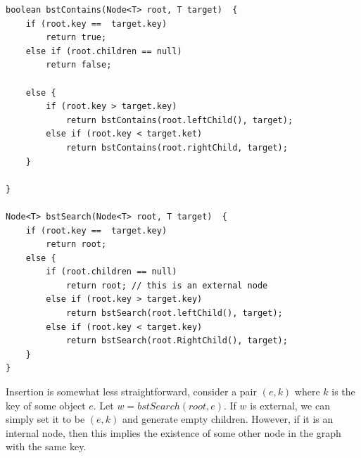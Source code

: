 \documentclass[9pt]{article} %
\begin{document}
	 \begin{lstlisting}
boolean bstContains(Node<T> root, T target)  {
	if (root.key ==  target.key)
		return true;
	else if (root.children == null)
		return false;
	
	else {
		if (root.key > target.key)
			return bstContains(root.leftChild(), target);
		else if (root.key < target.ket)
			return bstContains(root.rightChild, target);
	}
	
}

Node<T> bstSearch(Node<T> root, T target)  {
	if (root.key ==  target.key)
		return root;
	else {
		if (root.children == null)
			return root; // this is an external node
		else if (root.key > target.key)
			return bstSearch(root.leftChild(), target);
		else if (root.key < target.key)
			return bstSearch(root.RightChild(), target);
	}
}

	 \end{lstlisting}
	 Insertion is somewhat less straightforward, consider a pair $(e,k)$ where $k$ is the key of some object $e$. Let $w = bstSearch(root, e)$. If $w$ is external, we can simply set it to be $(e,k)$ and generate empty children. However, if it is an internal node, then this implies the existence of some other node in the graph with the same key.
\end{document}

